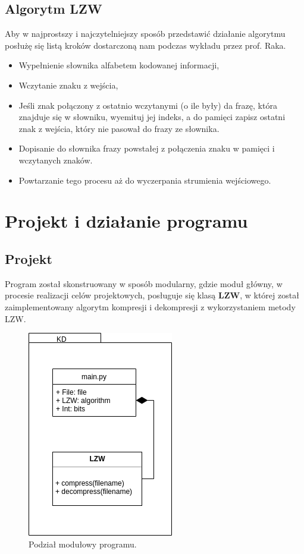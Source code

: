 \documentclass[12pt, a4paper]{article}
\begin{document}
\subsection{Algorytm LZW}
Aby w najprostszy i najczytelniejszy sposób przedstawić działanie algorytmu posłużę się listą kroków dostarczoną nam podczas wykładu przez prof. Raka.
\begin{itemize}
\item Wypełnienie słownika alfabetem kodowanej informacji,
\item Wczytanie znaku z wejścia,
\item Jeśli znak połączony z ostatnio wczytanymi (o ile były) da frazę, która znajduje się w słowniku, wyemituj jej indeks, a do pamięci zapisz ostatni znak z wejścia, który nie pasował do frazy ze słownika.
\item Dopisanie do słownika frazy powstałej z połączenia znaku w pamięci i wczytanych znaków.
\item Powtarzanie tego procesu aż do wyczerpania strumienia wejściowego.
\end{itemize}
\section{Projekt i działanie programu}
\subsection{Projekt}
Program został skonstruowany w sposób modularny, gdzie moduł główny, w procesie realizacji celów projektowych, posługuje się klasą \textbf{LZW}, w której został zaimplementowany algorytm kompresji i dekompresji z wykorzystaniem metody LZW.

\begin{figure}[!ht]
    \centering
    \includegraphics[scale=0.75]{uml.png}
    \caption{Podział modułowy programu.}
    \label{fig:MODULES}
\end{figure}
\end{document}

